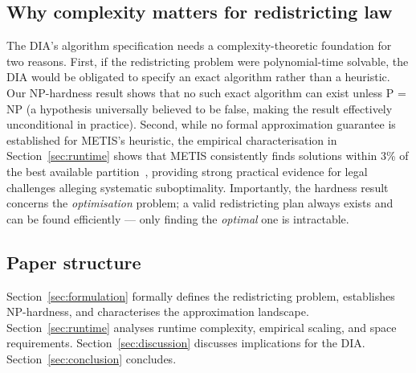 \subsection*{Why complexity matters for redistricting law}

The DIA's algorithm specification needs a complexity-theoretic foundation
for two reasons.  First, if the redistricting problem were polynomial-time
solvable, the DIA would be obligated to specify an exact algorithm rather
than a heuristic.  Our NP-hardness result shows that no such exact
algorithm can exist unless P = NP (a hypothesis universally believed to
be false, making the result effectively unconditional in practice).
Second, while no formal approximation guarantee is established for METIS's
heuristic, the empirical characterisation in Section~\ref{sec:runtime}
shows that METIS consistently finds solutions within 3\% of the best
available partition~\citep{b7paper}, providing strong practical evidence
for legal challenges alleging systematic suboptimality.
Importantly, the hardness result concerns the \emph{optimisation} problem;
a valid redistricting plan always exists and can be found efficiently ---
only finding the \emph{optimal} one is intractable.

\subsection*{Paper structure}

Section~\ref{sec:formulation} formally defines the redistricting problem,
establishes NP-hardness, and characterises the approximation landscape.
Section~\ref{sec:runtime} analyses runtime complexity, empirical scaling,
and space requirements.
Section~\ref{sec:discussion} discusses implications for the DIA.
Section~\ref{sec:conclusion} concludes.
